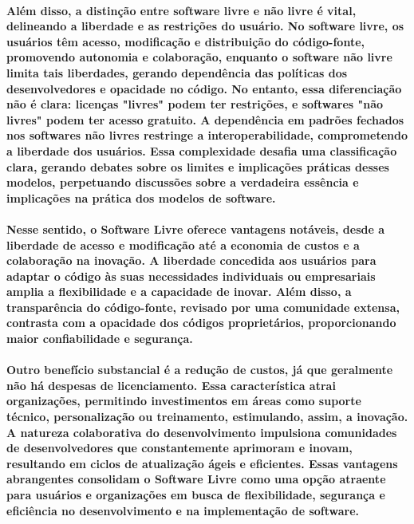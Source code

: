 \documentclass[a4paper, 12pt]{article}
\begin{document}
\paragraph{Além disso, a distinção entre software livre e não livre\cite{dado3} é vital, delineando a liberdade e as restrições do usuário. No software livre\cite{dado4}, os usuários têm acesso, modificação e distribuição do código-fonte, promovendo autonomia e colaboração, enquanto o software não livre limita tais liberdades, gerando dependência das políticas dos desenvolvedores e opacidade no código. No entanto, essa diferenciação não é clara: licenças "livres" podem ter restrições, e softwares "não livres" podem ter acesso gratuito. A dependência em padrões fechados nos softwares não livres restringe a interoperabilidade, comprometendo a liberdade dos usuários. Essa complexidade desafia uma classificação clara, gerando debates sobre os limites e implicações práticas desses modelos, perpetuando discussões sobre a verdadeira essência e implicações na prática dos modelos de software.}

\paragraph{Nesse sentido, o Software Livre oferece vantagens\cite{dado1} notáveis, desde a liberdade de acesso e modificação até a economia de custos e a colaboração na inovação. A liberdade concedida aos usuários para adaptar o código às suas necessidades individuais ou empresariais amplia a flexibilidade e a capacidade de inovar. Além disso, a transparência do código-fonte, revisado por uma comunidade extensa, contrasta com a opacidade dos códigos proprietários, proporcionando maior confiabilidade e segurança.}
\paragraph{Outro benefício substancial é a redução de custos\cite{dado5}, já que geralmente não há despesas de licenciamento. Essa característica atrai organizações, permitindo investimentos em áreas como suporte técnico, personalização ou treinamento, estimulando, assim, a inovação. A natureza colaborativa do desenvolvimento impulsiona comunidades de desenvolvedores que constantemente aprimoram e inovam, resultando em ciclos de atualização ágeis e eficientes. Essas vantagens abrangentes consolidam o Software Livre como uma opção atraente para usuários e organizações em busca de flexibilidade, segurança e eficiência no desenvolvimento e na implementação de software.}
\end{document}
